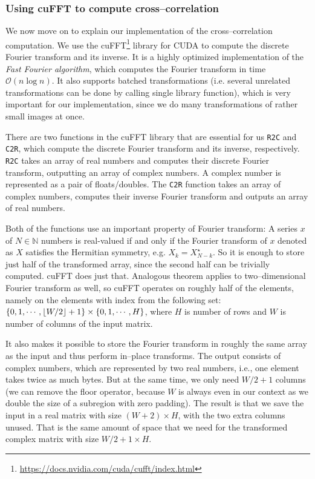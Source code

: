 \subsubsection{Using cuFFT to compute cross--correlation}
We now move on to explain our implementation of the cross--correlation computation. We use the cuFFT\footnote{\url{https://docs.nvidia.com/cuda/cufft/index.html}} library for CUDA to compute the discrete Fourier transform and its inverse. It is a highly optimized implementation of the \emph{Fast Fourier algorithm}, which computes the Fourier transform in time $\mathcal{O}(n \log n)$. It also supports batched transformations (i.e. several unrelated transformations can be done by calling single library function), which is very important for our implementation, since we do many transformations of rather small images at once. 

There are two functions in the cuFFT library that are essential for us \texttt{R2C} and \texttt{C2R}, which compute the discrete Fourier transform and its inverse, respectively. \texttt{R2C} takes an array of real numbers and computes their discrete Fourier transform, outputting an array of complex numbers. A complex number is represented as a pair of floats/doubles. The \texttt{C2R} function takes an array of complex numbers, computes their inverse Fourier transform and outputs an array of real numbers.

Both of the functions use an important property of Fourier transform: A series $x$ of $N \in \mathbb{N}$ numbers is real-valued if and only if the Fourier transform of $x$ denoted as $X$ satisfies the Hermitian symmetry, e.g. $X_k = X_{N-k}^\star$. So it is enough to store just half of the transformed array, since the second half can be trivially computed. cuFFT does just that. Analogous theorem applies to two--dimensional Fourier transform as well, so cuFFT operates on roughly half of the elements, namely on the elements with index from the following set: $\{0,1,\cdots, \lfloor W/2\rfloor + 1\} \times \{0, 1, \cdots, H\}$, where $H$ is number of rows and $W$ is number of columns of the input matrix.

It also makes it possible to store the Fourier transform in roughly the same array as the input and thus perform in--place transforms. The output consists of complex numbers, which are represented by two real numbers, i.e., one element takes twice as much bytes. But at the same time, we only need $W/2 + 1$ columns (we can remove the floor operator, because $W$ is always even in our context as we double the size of a subregion with zero padding). The result is that we save the input in a real matrix with size $(W+2) \times H$, with the two extra columns unused. That is the same amount of space that we need for the transformed complex matrix with size $W/2 + 1 \times H$.

